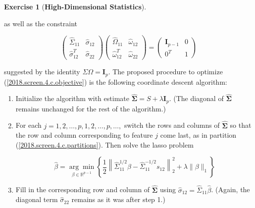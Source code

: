 \documentclass{article}
\theoremstyle{definition}
\newtheorem{exercise}{Exercise}
\theoremstyle{definition}
\theoremstyle{definition}
\theoremstyle{definition}
\theoremstyle{definition}
\begin{document}
\begin{exercise}[\textbf{High-Dimensional Statistics}]
\begin{enumerate}[(a)]
as well as the constraint

\begin{equation}\label{2018.screen.4.c.constraint}
 \begin{pmatrix} 
\hat{\Sigma}_{11} & \hat{\sigma}_{12} \\
\hat{\sigma}_{12}^T & \hat{\sigma}_{22}
\end{pmatrix}   \begin{pmatrix} 
\hat{\Omega}_{11} & \hat{\omega}_{12} \\
\hat{\omega}_{12}^T & \hat{\omega}_{22}
\end{pmatrix}=\begin{pmatrix}
\boldsymbol{I}_{p-1} & 0 \\
0^T & 1
\end{pmatrix}
\end{equation}

suggested by the identity \(\Sigma \Omega = \boldsymbol{I}_p\). The proposed procedure to optimize (\ref{2018.screen.4.c.objective}) is the following coordinate descent algorithm:

\begin{enumerate}[1.]

\item Initialize the algorithm with estimate \(\boldsymbol{\hat{\Sigma}} = S + \lambda \boldsymbol{I}_p\). (The diagonal of \(\boldsymbol{\hat{\Sigma}}\) remains unchanged for the rest of the algorithm.)

\item For each \(j = 1, 2, \ldots, p, 1, 2, \ldots, p, \ldots, \) switch the rows and columns of \(\boldsymbol{\hat{\Sigma}}\) so that the row and column corresponding to feature \(j\) come last, as in partition  (\ref{2018.screen.4.c.partitions}). Then solve the lasso problem

\begin{equation}\label{2008.screen.4.c.lasso.prob}
\hat{\beta} = \underset{\beta \in \mathbb{R}^{p-1}}{\arg \min} \left\{ \frac{1}{2} \left\lVert \hat{\Sigma}_{11}^{1/2} \beta - \hat{\Sigma}_{11}^{-1/2}s_{12}  \right\rVert_2^2 + \lambda \lVert \beta \rVert_1 \right\}
\end{equation}


\item Fill in the corresponding row and column of \(\boldsymbol{\hat{\Sigma}}\) using \(\hat{\sigma}_{12} = \hat{\Sigma}_{11} \hat{\beta}\). (Again, the diagonal term \(\hat{\sigma}_{22}\) remains as it was after step 1.)


\end{enumerate}
\end{enumerate}
\end{exercise}
\end{document}
